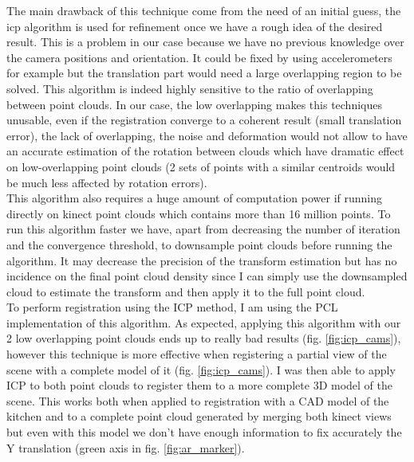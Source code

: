 The main drawback of this technique come from the need of an initial guess, the \acrshort{icp} algorithm is used for refinement once we have a rough idea of the desired result. This is a problem in our case because we have no previous knowledge over the camera positions and orientation. It could be fixed by using accelerometers for example but the translation part would need a large overlapping region to be solved. This algorithm is indeed highly sensitive to the ratio of overlapping between point clouds. In our case, the low overlapping makes this techniques unusable, even if the registration converge to a coherent result (small translation error), the lack of overlapping, the noise and deformation would not allow to have an accurate estimation of the rotation between clouds which have dramatic effect on low-overlapping point clouds (2 sets of points with a similar centroids would be much less affected by rotation errors). \\
This algorithm also requires a huge amount of computation power if running directly on kinect point clouds which contains more than 16 million points. To run this algorithm faster we have, apart from decreasing the number of iteration and the convergence threshold, to downsample point clouds before running the algorithm. It may decrease the precision of the transform estimation but has no incidence on the final point cloud density since I can simply use the downsampled cloud to estimate the transform and then apply it to the full point cloud.\\
\newline
To perform registration using the ICP method, I am using the PCL implementation of this algorithm. As expected, applying this algorithm with our 2 low overlapping point clouds ends up to really bad results (fig. \ref{fig:icp_cams}), however this technique is more effective when registering a partial view of the scene with a complete model of it (fig. \ref{fig:icp_cams}). I was then able to apply ICP to both point clouds to register them to a more complete 3D model of the scene. This works both when applied to registration with a CAD model of the kitchen and to a complete point cloud generated by merging both kinect views but even with this model we don't have enough information to fix accurately the Y translation (green axis in fig. \ref{fig:ar_marker}). \\

